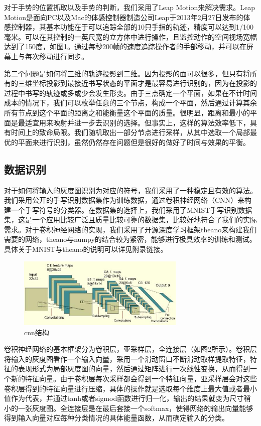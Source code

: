\documentclass[10pt, twocolumn]{article}
\begin{document}
	对于手势的位置抓取以及手势的判断，我们采用了Leap Motion来解决需求。Leap Motion是面向PC以及Mac的体感控制器制造公司Leap于2013年2月27日发布的体感控制器，其基本功能在于可以追踪全部的10只手指的轨迹，精度可以达到1/100毫米。可以在其控制的一英尺宽的立方体中进行操作，且监控动作的空间视场宽幅达到了150度，如图1。通过每秒200帧的速度追踪操作者的手部移动，并可以在屏幕上与每次移动进行同步。	

	第二个问题是如何将三维的轨迹投影到二维。因为投影的面可以很多，但只有将所有的三维坐标投影到最接近书写状态的平面才是最容易进行识别的，因为在投影的过程中书写的轨迹或多或少会发生形变。由于三点确定一个平面，如果在不计时间成本的情况下，我们可以枚举任意的三个节点，构成一个平面，然后通过计算其余所有节点到这个平面的距离之和能衡量这个平面的质量。很明显，距离和最小的平面是最适宜用来映射并进一步去识别的选择。但事实上，这样的算法效率低下，具有时间上的致命局限。我们随机取出一部分节点进行采样，从其中选取一个局部最优的平面来进行识别，虽然仍然存在问题但是很好的做好了时间与效果的平衡。

	\subsection{数据识别}

	对于如何将输入的灰度图识别为对应的符号，我们采用了一种稳定且有效的算法。我们采用公开的手写识别数据集作为训练数据，通过卷积神经网络（CNN）来构建一个手写符号的分类器。在数据集的选择上，我们采用了MNIST手写识别数据集，这是一个应用比较广泛且质量比较可靠的数据集，比较好地符合了我们的实际需求。对于卷积神经网络的实现，我们采用了开源深度学习框架theano来构建我们需要的网络，theano与numpy的结合较为紧密，能够进行极具效率的训练和测试。具体关于MNIST与theano的说明可以详见附录链接。


	\begin{figure}[htb]
	\centering
	\begin{minipage}[t]{1\linewidth}
	\centering
	\includegraphics[width=8cm]{cnn1.jpg}
	\caption{cnn结构}
	\label{fig: sample_cnn}
	\end{minipage}
	\end{figure}

	卷积神经网络的基本框架分为卷积层，亚采样层，全连接层（如图2所示）。卷积层将输入的灰度图看作一个输入向量，采用一个滑动窗口不断滑动取样提取特征，特征的表现形式为局部灰度图的向量，然后通过矩阵进行一次线性变换，从而得到一个新的特征向量。由于卷积层每次采样都会得到一个特征向量，亚采样层会对这些卷积层得到的特征向量进行压缩，具体的操作就是选取每个维度上最大值或者最小值作为代表，并通过tanh或者sigmod函数进行归一化，输出的结果就变为尺寸稍小的一张灰度图。全连接层是在最后套接一个softmax，使得网络的输出向量能够得到输入向量对应每种分类情况的具体能量函数，从而确定输入的分类。
\end{document}
